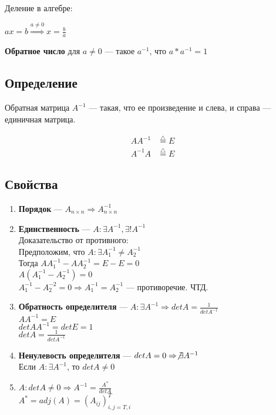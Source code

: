 \documentclass{article}
\begin{document}
Деление в алгебре:

$ax = b \stackrel{a \ne 0}{\Rightarrow} x = \frac{b}{a}$

\textbf{Обратное число} для $a \ne 0$ --- такое $a^{-1}$, что $a * a^{-1} = 1$

\subsection{Определение}

Обратная матрица $A^{-1}$ --- такая, что ее произведение и слева, и справа --- единичная матрица.

\begin{align*}
A A^{-1} &\stackrel{\triangle}{=} E \\
A^{-1} A &\stackrel{\triangle}{=} E
\end{align*}

\subsection{Свойства}

\begin{enumerate}
	\item \textbf{Порядок} --- $A_{n \times n} \Rightarrow A_{n \times n}^{-1}$
	\item \textbf{Единственность} --- $A : \exists A^{-1}, \exists ! A^{-1}$\\
	Доказательство от противного:\\
	Предположим, что $A : \exists A^{-1}_1 \ne A^{-1}_2$\\
	Тогда $A A_1^{-1} - A A_2^{-1} = E - E = 0$\\
	$A(A_1^{-1} - A_2^{-1}) = 0$\\
	$A_1^{-1} - A_2^{-2} = 0 \Rightarrow A_1^{-1} = A_2^{-1}$ --- противоречие. ЧТД.
	\item \textbf{Обратность определителя} --- $A : \exists A^{-1} \Rightarrow det A = \frac{1}{det A^{-1}}$\\
	$A A^{-1} = E$\\
	$det A A^{-1} = det E = 1$\\
	$det A = \frac{1}{det A^{-1}}$
	\item \textbf{Ненулевость определителя} --- $det A = 0 \Rightarrow \not \exists A^{-1}$\\
	Если $A : \exists A^{-1}$, то $det A \ne 0$
	\item $A : det A \ne 0 \Rightarrow A^{-1} = \frac{A^*}{det A}$\\
	$A^* = adj(A) = (A_{ij})_{i,j = T,i}^T$
\end{enumerate}
\end{document}
